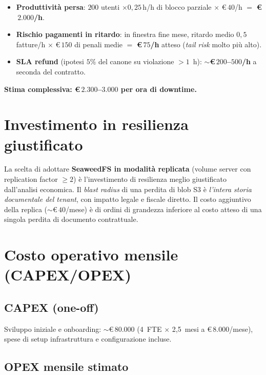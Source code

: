 \begin{itemize}[leftmargin=*]
    \item \textbf{Produttività persa}: $200$ utenti $\times 0{,}25$\,h/h di blocco
          parziale $\times$ \euro$\,40$/h $=$ \textbf{\euro$\,2.000$/h}.
    \item \textbf{Rischio pagamenti in ritardo}: in finestra fine mese,
          ritardo medio $0{,}5$ fatture/h $\times$ \euro$\,150$ di penali medie
          $=$ \textbf{\euro$\,75$/h} atteso (\emph{tail risk} molto pi\`u alto).
    \item \textbf{SLA refund} (ipotesi $5\%$ del canone su violazione $> 1$~h):
          \textbf{$\sim$\euro$\,200$--$500$/h} a seconda del contratto.
\end{itemize}

\textbf{Stima complessiva: \euro$\,2.300$--$3.000$ per ora di downtime.}

\section{Investimento in resilienza giustificato}
\label{sec:investimento_resilienza}

La scelta di adottare \textbf{SeaweedFS in modalit\`a replicata} (volume server con
replication factor $\geq 2$) \`e l'investimento di resilienza meglio giustificato
dall'analisi economica. Il \emph{blast radius} di una perdita di blob S3 \`e
\emph{l'intera storia documentale del tenant}, con impatto legale e fiscale diretto.
Il costo aggiuntivo della replica ($\sim$\euro$\,40$/mese) \`e di ordini di grandezza
inferiore al costo atteso di una singola perdita di documento contrattuale.

\section{Costo operativo mensile (CAPEX/OPEX)}
\label{sec:costi_opex}

\subsection{CAPEX (one-off)}

Sviluppo iniziale e onboarding: $\sim$\euro$\,80.000$ (4~FTE $\times$ 2,5~mesi
a \euro$\,8.000$/mese), spese di setup infrastruttura e configurazione incluse.

\subsection{OPEX mensile stimato}


